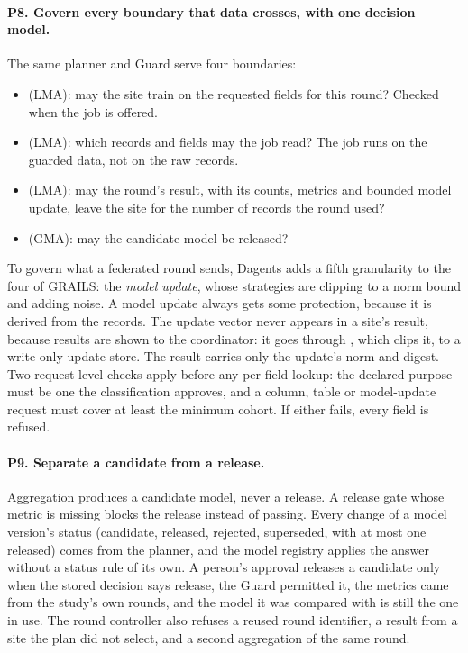 \paragraph{P8. Govern every boundary that data crosses, with one decision
model.} The same planner and Guard serve four boundaries:
\begin{itemize}
  \item {} (LMA): may the site train on the requested fields
        for this round? Checked when the job is offered.
  \item {} (LMA): which records and fields may the job read?
        The job runs on the guarded data, not on the raw records.
  \item {} (LMA): may the round's result, with its counts,
        metrics and bounded model update, leave the site for the number of
        records the round used?
  \item {} (GMA): may the candidate model be released?
\end{itemize}
To govern what a federated round sends, Dagents adds a fifth granularity to the
four of GRAILS: the \emph{model update}, whose strategies are clipping to a
norm bound and adding noise. A model update always gets some protection,
because it is derived from the records. The update vector never appears in a
site's result, because results are shown to the coordinator: it goes through
, which clips it, to a write-only update store. The result
carries only the update's norm and digest. Two request-level checks apply
before any per-field lookup: the declared purpose must be one the
classification approves, and a column, table or model-update request must cover
at least the minimum cohort. If either fails, every field is refused.

\paragraph{P9. Separate a candidate from a release.} Aggregation produces a
candidate model, never a release. A release gate whose metric is missing blocks
the release instead of passing. Every change of a model version's status
(candidate, released, rejected, superseded, with at most one released) comes
from the planner, and the model registry applies the answer without a status
rule of its own. A person's approval releases a candidate only when the stored
decision says release, the Guard permitted it, the metrics came from the
study's own rounds, and the model it was compared with is still the one in use.
The round controller also refuses a reused round identifier, a result from a
site the plan did not select, and a second aggregation of the same round.


